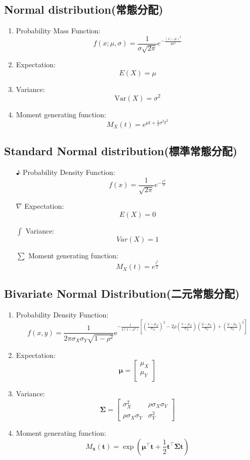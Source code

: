 \documentclass[12pt, a4paper]{article}
\begin{document}
\subsection{Normal distribution(常態分配)}
\begin{enumerate}[→]
\item Probability Mass Function:$$f(x;\mu,\sigma)=\frac{1}{\sigma\sqrt{2\pi}} e^{-\frac{(x-\mu)^2}{2\sigma^2}}$$
\item Expectation:$$E(X)=\mu$$
\item Variance:$$\text{Var}(X)=\sigma^2$$
\item Moment generating function:$$M_X(t)=e^{\mu t +\frac{1}{2}\sigma^2t^2}$$
\end{enumerate}
\subsection{Standard Normal distribution(標準常態分配)}
\begin{enumerate}
\item[♪] Probability Density Function:$$f(x)=\frac{1}{\sqrt{2\pi}} e^{-\frac{x^2}{2}}$$
\item[$\nabla$] Expectation:$$E(X)=0$$
\item[$\int$] Variance:$$Var(X)=1$$
\item[$\sum$] Moment generating function:$$M_X(t)=e^{\frac{t^2}{2}}$$
\end{enumerate}
\subsection{Bivariate Normal Distribution(二元常態分配)}
\begin{enumerate}
\item Probability Density Function:$${\displaystyle f(x,y)={\frac {1}{2\pi \sigma _{X}\sigma _{Y}{\sqrt {1-\rho ^{2}}}}}\mathrm {e} ^{-{\frac {1}{2(1-\rho ^{2})}}\left[({\frac {x-\mu _{X}}{\sigma _{X}}})^{2}-2\rho ({\frac {x-\mu _{X}}{\sigma _{X}}})({\frac {y-\mu _{Y}}{\sigma _{Y}}})+({\frac {y-\mu _{Y}}{\sigma _{Y}}})^{2}\right]}}$$
\item Expectation:$$\boldsymbol{\mu} = \begin{bmatrix}
   \mu_X \\
   \mu_Y \\
\end{bmatrix}$$
\item Variance:$$\boldsymbol{\Sigma} =\begin{bmatrix}
    \sigma_X^2&\rho\sigma_X\sigma_Y\\
    \rho\sigma_X\sigma_Y&\sigma_Y^2
\end{bmatrix}$$
\item Moment generating function:$$M_{\mathbf{x}}(\mathbf{t})=\exp\left(\boldsymbol{\mu}^\top \mathbf{t}+\frac{1}{2}\mathbf{t}^\top\boldsymbol{\Sigma} \mathbf{t}\right)$$
\end{enumerate}
\end{document}
